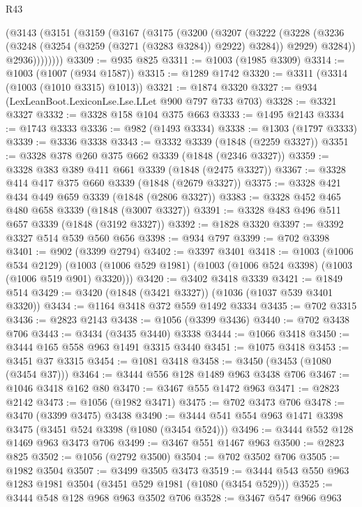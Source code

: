 \begin{lexlean}{R43}
\begin{coremodule}
      (@3143
        (@3151
          (@3159
            (@3167
              (@3175
                (@3200
                  (@3207
                    (@3222
                      (@3228
                        (@3236 (@3248 (@3254 (@3259 (@3271 (@3283 @3284)) @2922) @3284)) @2929)
                        @3284))
                    @2936))))))))
@3309 := @935 @825
@3311 := @1003 (@1985 @3309)
@3314 := @1003 (@1007 (@934 @1587))
@3315 := @1289 @1742
@3320 := @3311 (@3314 (@1003 (@1010 @3315) @1013))
@3321 := @1874 @3320
@3327 := @934 (LexLeanBoot.LexiconLse.Lse.LLet @900 @797 @733 @703)
@3328 := @3321 @3327
@3332 := @3328 @158 @104 @375 @663
@3333 := @1495 @2143
@3334 := @1743 @3333
@3336 := @982 (@1493 @3334)
@3338 := @1303 (@1797 @3333)
@3339 := @3336 @3338
@3343 := @3332 @3339 (@1848 (@2259 @3327))
@3351 := @3328 @378 @260 @375 @662 @3339 (@1848 (@2346 @3327))
@3359 := @3328 @383 @389 @411 @661 @3339 (@1848 (@2475 @3327))
@3367 := @3328 @414 @417 @375 @660 @3339 (@1848 (@2679 @3327))
@3375 := @3328 @421 @434 @449 @659 @3339 (@1848 (@2806 @3327))
@3383 := @3328 @452 @465 @480 @658 @3339 (@1848 (@3007 @3327))
@3391 := @3328 @483 @496 @511 @657 @3339 (@1848 (@3192 @3327))
@3392 := @1828 @3320
@3397 := @3392 @3327 @514 @539 @560 @656
@3398 := @934 @797
@3399 := @702 @3398
@3401 := @902 (@3399 @2794)
@3402 := @3397 @3401
@3418 := @1003
    (@1006 @534 @2129)
    (@1003 (@1006 @529 @1981) (@1003 (@1006 @524 @3398) (@1003 (@1006 @519 @901) @3320)))
@3420 := @3402 @3418 @3339
@3421 := @1849 @514
@3429 := @3420 (@1848 (@3421 @3327)) (@1036 (@1037 @539 @3401 @3320))
@3434 := @1164 @3418 @372 @559 @1492 @3334
@3435 := @702 @3315
@3436 := @2823 @2143
@3438 := @1056 (@3399 @3436)
@3440 := @702 @3438 @706
@3443 := @3434 (@3435 @3440) @3338
@3444 := @1066 @3418
@3450 := @3444 @165 @558 @963 @1491 @3315 @3440
@3451 := @1075 @3418
@3453 := @3451 @37 @3315
@3454 := @1081 @3418
@3458 := @3450 (@3453 (@1080 (@3454 @37)))
@3464 := @3444 @556 @128 @1489 @963 @3438 @706
@3467 := @1046 @3418 @162 @80
@3470 := @3467 @555 @1472 @963
@3471 := @2823 @2142
@3473 := @1056 (@1982 @3471)
@3475 := @702 @3473 @706
@3478 := @3470 (@3399 @3475) @3438
@3490 := @3444 @541 @554 @963 @1471 @3398 @3475 (@3451 @524 @3398 (@1080 (@3454 @524)))
@3496 := @3444 @552 @128 @1469 @963 @3473 @706
@3499 := @3467 @551 @1467 @963
@3500 := @2823 @825
@3502 := @1056 (@2792 @3500)
@3504 := @702 @3502 @706
@3505 := @1982 @3504
@3507 := @3499 @3505 @3473
@3519 := @3444 @543 @550 @963 @1283 @1981 @3504 (@3451 @529 @1981 (@1080 (@3454 @529)))
@3525 := @3444 @548 @128 @968 @963 @3502 @706
@3528 := @3467 @547 @966 @963

\end{coremodule}
\end{lexlean}
